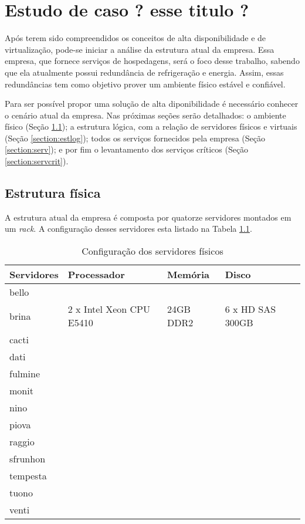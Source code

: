 \chapter{Estudo de caso ? esse titulo ?}
\label{cap:estudodecaso}

Após terem sido compreendidos os conceitos de alta disponibilidade e de virtualização, pode-se iniciar a análise da estrutura atual da empresa.
Essa empresa, que fornece serviços de hospedagens, será o foco desse trabalho, sabendo que ela atualmente possui redundância de refrigeração 
e energia. Assim, essas redundâncias tem como objetivo prover um ambiente físico estável e confiável.

Para ser possível propor uma solução de alta diponibilidade é necessário conhecer o cenário atual da empresa. 
Nas próximas seções serão detalhados: o ambiente físico (Seção \ref{section:estfis}); a estrutura lógica, com a relação de servidores físicos
e virtuais (Seção \ref{section:estlog}); todos os serviços fornecidos pela empresa (Seção \ref{section:serv}); e por fim o levantamento
dos serviços críticos (Seção \ref{section:servcrit}).

\section{Estrutura física}
\label{section:estfis}

A estrutura atual da empresa é composta por quatorze servidores montados em um \textit{rack}. A configuração desses servidores esta listado
na Tabela \ref{tab:servfisicos}.

\begin{table}
\caption {Configuração dos servidores físicos}
\label{tab:servfisicos}
\begin{center}
\begin{tabular}{|l|l|l|l|l|}\hline
Servidores & Processador & Memória & Disco\\\hline
bello &  &  & \\\hline
brina & 2 x Intel Xeon CPU E5410 & 24GB DDR2 & 6 x HD SAS 300GB\\\hline
cacti &  &  &  \\\hline
dati &  &  & \\\hline
fulmine &  &  & \\\hline
monit &  &  & \\\hline
nino &  &  & \\\hline
piova &  &  & \\\hline
raggio &  &  & \\\hline
sfrunhon &  &  & \\\hline
tempesta &  &  & \\\hline
tuono &  &  & \\\hline
venti &  &  & \\\hline
\end{tabular}
\end{center}
\end{table}


